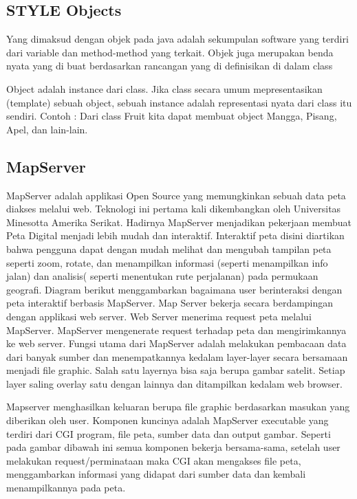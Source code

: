 \subsection{STYLE Objects}
Yang dimaksud dengan objek pada java adalah sekumpulan software yang terdiri dari variable dan method-method yang terkait. 
Objek juga merupakan benda nyata yang di buat berdasarkan rancangan yang di definisikan di dalam class

Object adalah instance dari class. Jika class secara umum mepresentasikan (template) sebuah object, 
sebuah instance adalah representasi nyata dari class itu sendiri. Contoh : Dari class Fruit kita dapat membuat object Mangga, 
Pisang, Apel, dan lain-lain.

\subsection{MapServer}
MapServer adalah applikasi Open Source yang memungkinkan sebuah data peta diakses melalui web. Teknologi ini pertama kali dikembangkan oleh Universitas Minesotta Amerika Serikat. Hadirnya MapServer menjadikan pekerjaan membuat Peta Digital menjadi lebih mudah dan interaktif. Interaktif peta disini diartikan bahwa pengguna dapat dengan mudah melihat dan mengubah tampilan peta seperti zoom, rotate, dan menampilkan informasi (seperti menampilkan info jalan) dan analisis( seperti menentukan rute perjalanan) pada permukaan geografi. Diagram berikut menggambarkan bagaimana user berinteraksi dengan peta interaktif berbasis MapServer.
Map Server bekerja secara berdampingan dengan applikasi web server. Web Server menerima request peta melalui MapServer. MapServer mengenerate request terhadap peta dan mengirimkannya ke web server. Fungsi utama dari MapServer adalah melakukan pembacaan data dari banyak sumber dan menempatkannya kedalam layer-layer secara bersamaan menjadi file graphic. Salah satu layernya bisa saja berupa gambar satelit. Setiap layer saling overlay satu dengan lainnya dan ditampilkan kedalam web browser.

Mapserver menghasilkan keluaran berupa file graphic berdasarkan masukan yang diberikan oleh user. 
Komponen kuncinya adalah MapServer executable yang terdiri dari CGI program, file peta, sumber data dan output gambar. 
Seperti pada gambar dibawah ini semua komponen bekerja bersama-sama, 
setelah user melakukan request/perminataan maka CGI akan mengakses file peta, 
menggambarkan informasi yang didapat dari sumber data dan kembali menampilkannya pada peta.

